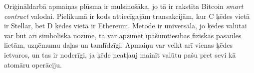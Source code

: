 Oriģināldarbā apmaiņas plūsma ir mulsinošāka, jo tā ir rakstīta Bitcoin \textit{smart contract} valodai. Pielikumā ir kods attiecīgajām transakcijām, kur C ķēdes vietā ir Stellar, bet D ķēdes vietā ir Ethereum.
Metode ir universāla, jo ķēdes valūtai var būt arī simboliska nozīme, tā var apzīmēt īpašumtiesības fiziskās pasaules lietām, uzņēmumu daļas un tamlīdzīgi.\cite{rosenfeld12}
Apmaiņu var veikt arī vienas ķēdes ietvaros, un tas ir noderīgi, ja ķēde neatļauj mainīt valūtu pašu pret sevi kā atomāru operāciju.
